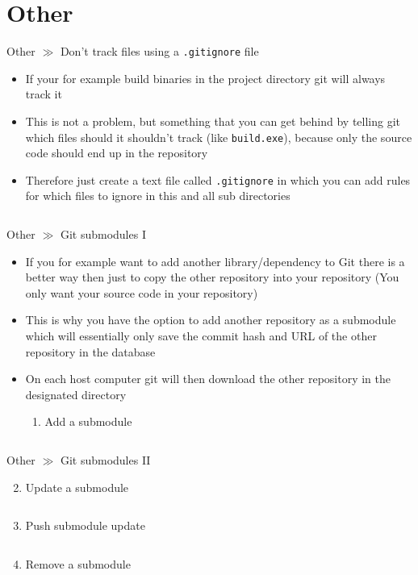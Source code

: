 \documentclass[10pt]{beamer}
\begin{document}
\section{Other}

\begin{frame}{Other $\gg$ Don't track files using a \texttt{.gitignore} file}
	\begin{itemize}
		\item If your for example build binaries in the project directory git will always track it
		\item This is not a problem, but something that you can get behind by telling git which files should it shouldn't track (like \texttt{build.exe}), because only the source code should end up in the repository
		\item Therefore just create a text file called \texttt{.gitignore} in which you can add rules for which files to ignore in this and all sub directories
		\inputminted[bgcolor=lightGreyCustom,fontsize=\scriptsize]{sh}{./resources/.gitignore}
	\end{itemize}
\end{frame}

\begin{frame}{Other $\gg$ Git submodules I}
	\begin{itemize}
		\item If you for example want to add another library/dependency to Git there is a better way then just to copy the other repository into your repository (You only want your source code in your repository)
		\item This is why you have the option to add another repository as a submodule which will essentially only save the commit hash and URL of the other repository in the database
		\item On each host computer git will then download the other repository in the designated directory
		\begin{enumerate}
			\item Add a submodule
			\inputminted[bgcolor=lightGreyCustom,fontsize=\scriptsize]{sh}{./resources/git_submodule_01_add.sh}
		\end{enumerate}
	\end{itemize}
\end{frame}

\begin{frame}{Other $\gg$ Git submodules II}
	\begin{enumerate}\setcounter{enumi}{1}
		\item Update a submodule
		\inputminted[bgcolor=lightGreyCustom,fontsize=\scriptsize]{sh}{./resources/git_submodule_02_update.sh}
		\item Push submodule update
		\inputminted[bgcolor=lightGreyCustom,fontsize=\scriptsize]{sh}{./resources/git_submodule_03_push_update.sh}
		\item Remove a submodule
		\inputminted[bgcolor=lightGreyCustom,fontsize=\scriptsize]{sh}{./resources/git_submodule_04_remove.sh}
	\end{enumerate}
\end{frame}
\end{document}
